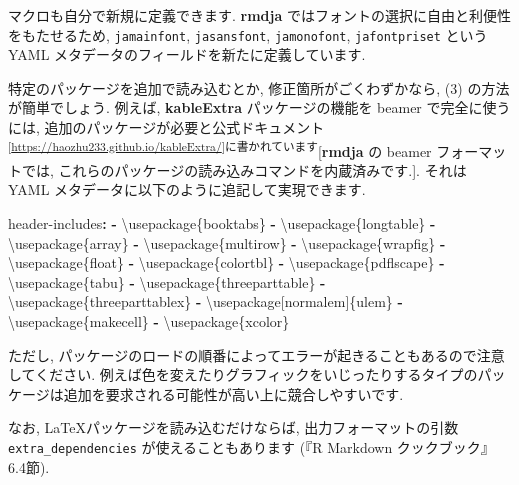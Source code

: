 \documentclass[
]{bxjsarticle}
\newenvironment{Shaded}{\begin{snugshade}}{\end{snugshade}}
\newcommand{\AttributeTok}[1]{\textcolor[rgb]{0.77,0.63,0.00}{#1}}
\newcommand{\FunctionTok}[1]{\textcolor[rgb]{0.00,0.00,0.00}{#1}}
\newcommand{\KeywordTok}[1]{\textcolor[rgb]{0.13,0.29,0.53}{\textbf{#1}}}
\begin{document}
マクロも自分で新規に定義できます. \textbf{rmdja} ではフォントの選択に自由と利便性をもたせるため, \texttt{jamainfont}, \texttt{jasansfont}, \texttt{jamonofont}, \texttt{jafontpriset} という YAML メタデータのフィールドを新たに定義しています.

特定のパッケージを追加で読み込むとか, 修正箇所がごくわずかなら, (3) の方法が簡単でしょう. 例えば, \textbf{kableExtra} パッケージの機能を beamer で完全に使うには, 追加のパッケージが必要と公式ドキュメント\textsuperscript{{[}\url{https://haozhu233.github.io/kableExtra/}{]}に書かれています}{[}\textbf{rmdja} の beamer フォーマットでは, これらのパッケージの読み込みコマンドを内蔵済みです.{]}. それは YAML メタデータに以下のように追記して実現できます.

\begin{Shaded}
\begin{Highlighting}[numbers=left,,]
\FunctionTok{header{-}includes}\KeywordTok{:}
\AttributeTok{  }\KeywordTok{{-}}\AttributeTok{ \textbackslash{}usepackage\{booktabs\}}
\AttributeTok{  }\KeywordTok{{-}}\AttributeTok{ \textbackslash{}usepackage\{longtable\}}
\AttributeTok{  }\KeywordTok{{-}}\AttributeTok{ \textbackslash{}usepackage\{array\}}
\AttributeTok{  }\KeywordTok{{-}}\AttributeTok{ \textbackslash{}usepackage\{multirow\}}
\AttributeTok{  }\KeywordTok{{-}}\AttributeTok{ \textbackslash{}usepackage\{wrapfig\}}
\AttributeTok{  }\KeywordTok{{-}}\AttributeTok{ \textbackslash{}usepackage\{float\}}
\AttributeTok{  }\KeywordTok{{-}}\AttributeTok{ \textbackslash{}usepackage\{colortbl\}}
\AttributeTok{  }\KeywordTok{{-}}\AttributeTok{ \textbackslash{}usepackage\{pdflscape\}}
\AttributeTok{  }\KeywordTok{{-}}\AttributeTok{ \textbackslash{}usepackage\{tabu\}}
\AttributeTok{  }\KeywordTok{{-}}\AttributeTok{ \textbackslash{}usepackage\{threeparttable\}}
\AttributeTok{  }\KeywordTok{{-}}\AttributeTok{ \textbackslash{}usepackage\{threeparttablex\}}
\AttributeTok{  }\KeywordTok{{-}}\AttributeTok{ \textbackslash{}usepackage[normalem]\{ulem\}}
\AttributeTok{  }\KeywordTok{{-}}\AttributeTok{ \textbackslash{}usepackage\{makecell\}}
\AttributeTok{  }\KeywordTok{{-}}\AttributeTok{ \textbackslash{}usepackage\{xcolor\}}
\end{Highlighting}
\end{Shaded}

ただし, パッケージのロードの順番によってエラーが起きることもあるので注意してください. 例えば色を変えたりグラフィックをいじったりするタイプのパッケージは追加を要求される可能性が高い上に競合しやすいです.

なお, LaTeXパッケージを読み込むだけならば, 出力フォーマットの引数 \texttt{extra\_dependencies} が使えることもあります (『R Markdown クックブック』6.4節).
\end{document}
